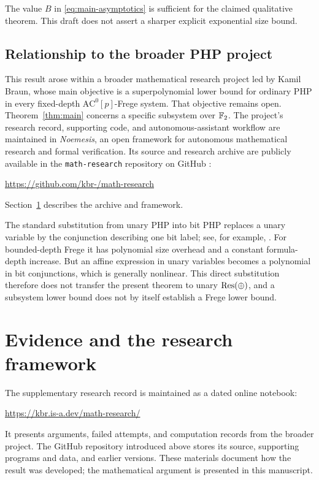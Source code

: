 The value \(B\) in \eqref{eq:main-asymptotics} is sufficient for the
claimed qualitative theorem. This draft does not assert a sharper
explicit exponential size bound.

\subsection{Relationship to the broader PHP project}
This result arose within a broader mathematical research project led by
Kamil Braun, whose main objective is a superpolynomial lower
bound for ordinary PHP in every fixed-depth
\(\mathrm{AC}^0[p]\)-Frege system. That objective remains open.
Theorem~\ref{thm:main} concerns a specific subsystem over \(\mathbb F_2\).
The project's research record, supporting code, and autonomous-assistant
workflow are maintained in \emph{Noemesis}, an open framework for autonomous
mathematical research and formal verification. Its source and research archive
are publicly available in the \texttt{math-research} repository on GitHub
\cite{Repo}:
\begin{center}
 \url{https://github.com/kbr-/math-research}
\end{center}
Section~\ref{sec:framework} describes the archive and framework.

The standard substitution from unary PHP into bit PHP replaces a unary
variable by the conjunction describing one bit label; see, for example,
\cite{BB21}. For bounded-depth Frege it has polynomial size overhead
and a constant formula-depth increase. But an affine expression in
unary variables becomes a polynomial in bit conjunctions, which is
generally nonlinear. This direct substitution therefore does not
transfer the present theorem to unary \(\mathrm{Res}(\oplus)\), and a subsystem lower
bound does not by itself establish a Frege lower bound.

\section{Evidence and the research framework}\label{sec:framework}

The supplementary research record is maintained as a dated online notebook:
\begin{center}
 \url{https://kbr.is-a.dev/math-research/}
\end{center}
It presents arguments, failed attempts, and computation records from the
broader project. The GitHub repository introduced above stores its source,
supporting programs and data, and earlier versions. These materials document
how the result was developed; the mathematical argument is presented in
this manuscript.

